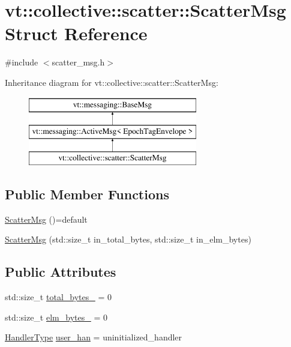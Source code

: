 \hypertarget{structvt_1_1collective_1_1scatter_1_1_scatter_msg}{}\section{vt\+:\+:collective\+:\+:scatter\+:\+:Scatter\+Msg Struct Reference}
\label{structvt_1_1collective_1_1scatter_1_1_scatter_msg}


{\ttfamily \#include $<$scatter\+\_\+msg.\+h$>$}

Inheritance diagram for vt\+:\+:collective\+:\+:scatter\+:\+:Scatter\+Msg\+:\begin{figure}[H]
\begin{center}
\leavevmode
\includegraphics[height=3.000000cm]{structvt_1_1collective_1_1scatter_1_1_scatter_msg}
\end{center}
\end{figure}
\subsection*{Public Member Functions}
\begin{DoxyCompactItemize}
\item 
\hyperlink{structvt_1_1collective_1_1scatter_1_1_scatter_msg_ab393af0a9d5fafdbb6524e0526626757}{Scatter\+Msg} ()=default
\item 
\hyperlink{structvt_1_1collective_1_1scatter_1_1_scatter_msg_a7803844bde5a3de0bec52aa713371c50}{Scatter\+Msg} (std\+::size\+\_\+t in\+\_\+total\+\_\+bytes, std\+::size\+\_\+t in\+\_\+elm\+\_\+bytes)
\end{DoxyCompactItemize}
\subsection*{Public Attributes}
\begin{DoxyCompactItemize}
\item 
std\+::size\+\_\+t \hyperlink{structvt_1_1collective_1_1scatter_1_1_scatter_msg_abe4355e04677b1e6bcb1dcccf3beac75}{total\+\_\+bytes\+\_\+} = 0
\item 
std\+::size\+\_\+t \hyperlink{structvt_1_1collective_1_1scatter_1_1_scatter_msg_a14af4f6a3037beeb5048797c7cf15fdb}{elm\+\_\+bytes\+\_\+} = 0
\item 
\hyperlink{namespacevt_af64846b57dfcaf104da3ef6967917573}{Handler\+Type} \hyperlink{structvt_1_1collective_1_1scatter_1_1_scatter_msg_ab99b929e800794c73fe3b845c8d9f794}{user\+\_\+han} = uninitialized\+\_\+handler
\end{DoxyCompactItemize}
